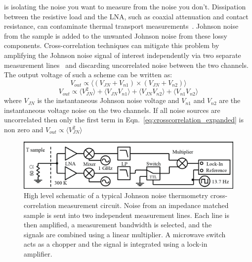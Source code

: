  is isolating the noise you want to measure from the noise you don't. Dissipation between the resistive load and the LNA, such as coaxial attenuation and contact resistance, can contaminate thermal transport measurements~\cite{white_status_1996, glattli_noise_1997}. Johnson noise from the sample is added to the unwanted Johnson noise from these lossy components. Cross-correlation techniques can mitigate this problem by amplifying the Johnson noise signal of interest independently via two separate measurement lines~\cite{glattli_noise_1997, dicarlo_system_2006, henny_1/3-shot-noise_1999, brophy_correlatoramplifier_1965, klein_measurement_1979} and discarding uncorrelated noise between the two channels. The output voltage of such a scheme can be written as:
\begin{equation}
V_{out}\propto\langle\left(V_{JN}+V_{n1}\right)\times\left(V_{JN}+V_{n2}\right)\rangle 
\end{equation}
\begin{equation}\label{eq:crosscorrelation_expanded}
V_{out}\propto\langle V_{JN}^2\rangle + \langle V_{JN}V_{n1}\rangle+\langle V_{JN}V_{n2}\rangle+\langle V_{n1}V_{n2}\rangle
\end{equation}
where $V_{JN}$ is the instantaneous Johnson noise voltage and $V_{n1}$ and $V_{n2}$ are the instantaneous voltage noise on the two channels. If all noise sources are uncorrelated then only the first term in Eqn.~\ref{eq:crosscorrelation_expanded} is non zero and ${V_{out}\propto\langle V_{JN}^2\rangle}$
\begin{figure}
\centering
\includegraphics[width=\textwidth]{figures/Johnson_noise_thermometry/Schematic_Crosscorrelation.png}
\caption[JNT crosscorrelation schematic]{High level schematic of a typical Johnson noise thermometry cross-correlation measurement circuit. Noise from an impedance matched sample is sent into two independent measurement lines. Each line is then amplified, a measurement bandwidth is selected, and the signals are combined using a linear multiplier. A microwave switch acts as a chopper and the signal is integrated using a lock-in amplifier.}
\label{fig:schematic_crosscorrelation}
\end{figure}
